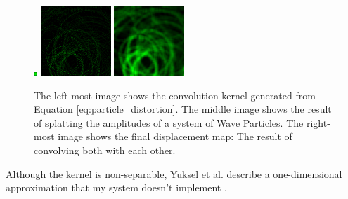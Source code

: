 \documentclass[12pt,a4paper,twoside]{report}
\begin{document}
\begin{figure}[h]
\centering
\includegraphics[width=0.1\linewidth]{convolution_2D_kernel}
\includegraphics[width=0.4\linewidth]{splat_texture}
\includegraphics[width=0.4\linewidth]{displacement_map_texture}
\caption{The left-most image shows the convolution kernel generated from
Equation \ref{eq:particle_distortion}. The middle image shows the result of
splatting the amplitudes of a system of Wave Particles. The right-most image
shows the final displacement map: The result of convolving both with each
other.}
\label{fig:convolution_2D_example}
\end{figure}

Although the kernel is non-separable, Yuksel et al. describe a one-dimensional
approximation that my system doesn't implement \cite{Yuksel2007}.




\end{document}
